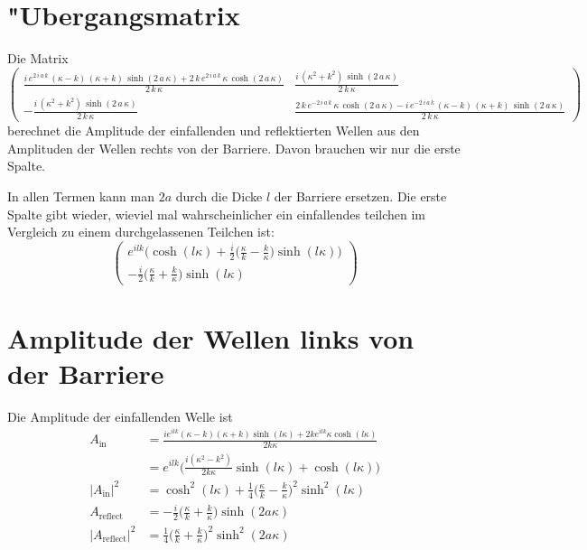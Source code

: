 \section{"Ubergangsmatrix}
Die Matrix
\[
\begin{pmatrix}
\frac{i\,e^{2\,i\,a\,k}\,\left(\kappa-k\right)\,\left(\kappa+k
 \right)\,\sinh \left(2\,a\,\kappa\right)+2\,k\,e^{2\,i\,a\,k}\,
 \kappa\,\cosh \left(2\,a\,\kappa\right)}{2\,k\,\kappa}
&
\frac{i\,
 \left(\kappa^2+k^2\right)\,\sinh \left(2\,a\,\kappa\right)}{2\,
 k\,\kappa}
\\
-\frac{i\,\left(\kappa^2+k^2\right)\,\sinh \left(2\,a\,
 \kappa\right)}{2\,k\,\kappa}
&
\frac{2\,k\,e^ {- 2\,i\,a\,k }\,
 \kappa\,\cosh \left(2\,a\,\kappa\right)-i\,e^ {- 2\,i\,a\,k }\,
 \left(\kappa-k\right)\,\left(\kappa+k\right)\,\sinh \left(2\,a\,
 \kappa\right)}{2\,k\,\kappa}
\end{pmatrix}
\]
berechnet die Amplitude der einfallenden und reflektierten Wellen
aus den Amplituden der Wellen rechts von der Barriere.
Davon brauchen wir nur die erste Spalte.

In allen Termen kann man $2a$ durch die Dicke $l$ der Barriere ersetzen.
Die erste Spalte gibt wieder, wieviel mal wahrscheinlicher ein einfallendes
teilchen im Vergleich zu einem durchgelassenen Teilchen ist:
\[
\begin{pmatrix}
\displaystyle
e^{ilk}\biggl(\cosh(l\kappa)
+\frac{i}{2}\biggl(\frac{\kappa}{k}-\frac{k}{\kappa}\biggr)\sinh(l\kappa)
\biggr)
\\
\displaystyle
- \frac{i}{2}
\biggl(\frac{\kappa}{k}+\frac{k}{\kappa}\biggr)
\sinh(l\kappa)
\end{pmatrix}
\]

\section{Amplitude der Wellen links von der Barriere}
Die Amplitude der einfallenden Welle ist
\begin{align*}
A_{\text{in}}
&=
\frac{i e^{i l k} (\kappa-k) (\kappa+k) 
 \sinh (l \kappa)+2 k e^{i l k} \kappa \cosh 
 (l \kappa)}{2 k \kappa}
\\
&=
e^{i l k}
\biggl(
\frac{
i
(\kappa^2-k^2)
}{2 k \kappa}
\sinh (l \kappa)
+
\cosh (l \kappa)
\biggr)
\\
|A_{\text{in}}|^2
&=
\cosh^2(l\kappa)
+
\frac14\biggl(
\frac{\kappa}{k}-\frac{k}{\kappa}
\biggr)^2
\sinh^2(l\kappa)
\\
A_{\text{reflect}}
&=
-\frac{i}{2}
\biggl(\frac{\kappa}{k}+\frac{k}{\kappa}\biggr)
\sinh (2 a \kappa)
\\
|A_{\text{reflect}}|^2
&=
\frac14
\biggl(\frac{\kappa}{k}+\frac{k}{\kappa}\biggr)^2
\sinh^2 (2 a \kappa)
\end{align*}

